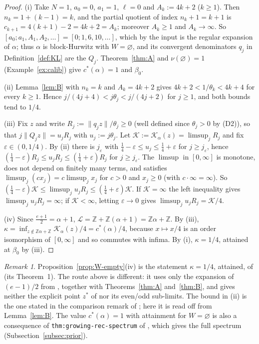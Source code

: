 \documentclass[11pt]{amsart}
\theoremstyle{definition}
\theoremstyle{remark}
\newtheorem{remark}[theorem]{Remark}
\newcommand{\Z}{\mathbb{Z}}
\newcommand{\dist}[1]{\lVert #1\rVert}
\newcommand{\KL}{\mathcal{K}}
\begin{document}
\begin{proof}
(i) Take $N=1$, $a_0=0$, $a_1=1$, $\ell=0$ and $A_k:=4k+2$ ($k\ge1$). Then $n_k=1+(k-1)=k$, and the partial quotient
of index $n_k+1=k+1$ is $c_{k+1}=4(k+1)-2=4k+2=A_k$; moreover $A_k\ge1$ and $A_k\to\infty$. So
$[a_0;a_1,A_1,A_2,\dots]=[0;1,6,10,\dots]$, which by the input is the regular expansion of $\alpha$; thus $\alpha$ is
block-Hurwitz with $W=\varnothing$, and its convergent denominators $q_j$ in Definition~\ref{def:KL} are the $Q_j$.
Theorem~\ref{thm:A} and $\nu(\varnothing)=1$ (Example~\ref{ex:calib}) give $c^*(\alpha)=1$ and $\beta_0$.

(ii) Lemma~\ref{lem:B} with $n_k=k$ and $A_k=4k+2$ gives $4k+2<1/\theta_k<4k+4$ for every $k\ge1$. Hence
$j/(4j+4)<j\theta_j<j/(4j+2)$ for $j\ge1$, and both bounds tend to $1/4$.

(iii) Fix $z$ and write $R_j:=\dist{q_jz}/\theta_j\ge0$ (well defined since $\theta_j>0$ by (D2)), so that
$j\dist{Q_jz}=u_jR_j$ with $u_j:=j\theta_j$. Let $\KL:=\KL_\alpha(z)=\limsup_jR_j$ and fix $\varepsilon\in(0,1/4)$. By (ii)
there is $j_\varepsilon$ with $\frac14-\varepsilon\le u_j\le\frac14+\varepsilon$ for $j\ge j_\varepsilon$, hence
$(\frac14-\varepsilon)R_j\le u_jR_j\le(\frac14+\varepsilon)R_j$ for $j\ge j_\varepsilon$. The $\limsup$ in $[0,\infty]$ is monotone, does
not depend on finitely many terms, and satisfies $\limsup_j(cx_j)=c\limsup_jx_j$ for $c>0$ and $x_j\ge0$ (with
$c\cdot\infty=\infty$). So $(\frac14-\varepsilon)\KL\le\limsup_ju_jR_j\le(\frac14+\varepsilon)\KL$. If $\KL=\infty$ the left
inequality gives $\limsup_ju_jR_j=\infty$; if $\KL<\infty$, letting $\varepsilon\to0$ gives $\limsup_ju_jR_j=\KL/4$.

(iv) Since $\frac{e+1}2=\alpha+1$, $\mathcal L=\Z+\Z(\alpha+1)=\Z\alpha+\Z$. By (iii),
$\kappa=\inf_{z\notin\Z\alpha+\Z}\KL_\alpha(z)/4=c^*(\alpha)/4$, because $x\mapsto x/4$ is an order isomorphism of $[0,\infty]$
and so commutes with infima. By (i), $\kappa=1/4$, attained at $\beta_0$ by (iii).
\end{proof}

\begin{remark}\label{rem:W-empty}
Proposition~\ref{prop:W-empty}(iv) is the statement $\kappa=1/4$, attained, of \cite{D5} (its Theorem~1). The route
above is different: it uses only the expansion of $(e-1)/2$ from \cite{D5}, together with Theorems~\ref{thm:A}
and~\ref{thm:B}, and gives neither the explicit point $z^*$ of \cite{D5} nor its even/odd sub-limits. The bound in
(ii) is the one stated in the comparison remark of \cite{D5}; here it is read off from Lemma~\ref{lem:B}. The value
$c^*(\alpha)=1$ with attainment for $W=\varnothing$ is also a consequence of \texttt{thm:growing-rec-spectrum} of
\cite{P2}, which gives the full spectrum (Subsection~\ref{subsec:prior}).
\end{remark}
\end{document}
